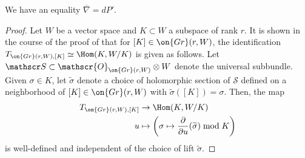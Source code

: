 \begin{lemma}
\notready
	\label{lemma:connection-and-period-map}
	We have an equality $\overline \nabla = dP'$.
\end{lemma}
\begin{proof}
	Let $W$ be a vector space and $K\subset W$ a subspace of rank $r$. It is shown in the course of the proof of \cite[Lemma 10.7]{Voisin:hodgeTheory}
	that for $[K] \in \on{Gr}(r,W)$, the identification $T_{\on{Gr}(r,W),[K]} \simeq
	\Hom(K,W/K)$ is given as follows.
	Let $\mathscr S \subset \mathscr{O}_{\on{Gr}(r,W)} \otimes W$ denote the universal
	subbundle.
	Given $\sigma \in K$, let $\widetilde{\sigma}$
	denote a choice of holomorphic section of $\mathscr S$
	defined on a neighborhood of $[K] \in \on{Gr}(r,W)$ with $\widetilde{\sigma}([K]) =
	\sigma$.
	Then, the map
	\begin{align*}
		T_{\on{Gr}(r, W), [K]} &\to \Hom(K, W/K) \\
		u &\mapsto \left( \sigma \mapsto \frac{\partial }{\partial
		u} (\widetilde{\sigma}) \bmod K \right)
	\end{align*}
	is well-defined and independent of the choice of lift $\widetilde{\sigma}$.


\end{proof}
